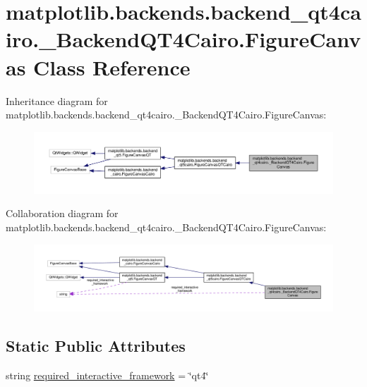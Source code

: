 \hypertarget{classmatplotlib_1_1backends_1_1backend__qt4cairo_1_1__BackendQT4Cairo_1_1FigureCanvas}{}\section{matplotlib.\+backends.\+backend\+\_\+qt4cairo.\+\_\+\+Backend\+Q\+T4\+Cairo.\+Figure\+Canvas Class Reference}
\label{classmatplotlib_1_1backends_1_1backend__qt4cairo_1_1__BackendQT4Cairo_1_1FigureCanvas}


Inheritance diagram for matplotlib.\+backends.\+backend\+\_\+qt4cairo.\+\_\+\+Backend\+Q\+T4\+Cairo.\+Figure\+Canvas\+:
\nopagebreak
\begin{figure}[H]
\begin{center}
\leavevmode
\includegraphics[width=350pt]{classmatplotlib_1_1backends_1_1backend__qt4cairo_1_1__BackendQT4Cairo_1_1FigureCanvas__inherit__graph}
\end{center}
\end{figure}


Collaboration diagram for matplotlib.\+backends.\+backend\+\_\+qt4cairo.\+\_\+\+Backend\+Q\+T4\+Cairo.\+Figure\+Canvas\+:
\nopagebreak
\begin{figure}[H]
\begin{center}
\leavevmode
\includegraphics[width=350pt]{classmatplotlib_1_1backends_1_1backend__qt4cairo_1_1__BackendQT4Cairo_1_1FigureCanvas__coll__graph}
\end{center}
\end{figure}
\subsection*{Static Public Attributes}
\begin{DoxyCompactItemize}
\item 
string \hyperlink{classmatplotlib_1_1backends_1_1backend__qt4cairo_1_1__BackendQT4Cairo_1_1FigureCanvas_a6cff061165d1c5dd3cb972ef7e3b4c47}{required\+\_\+interactive\+\_\+framework} = \char`\"{}qt4\char`\"{}
\end{DoxyCompactItemize}
